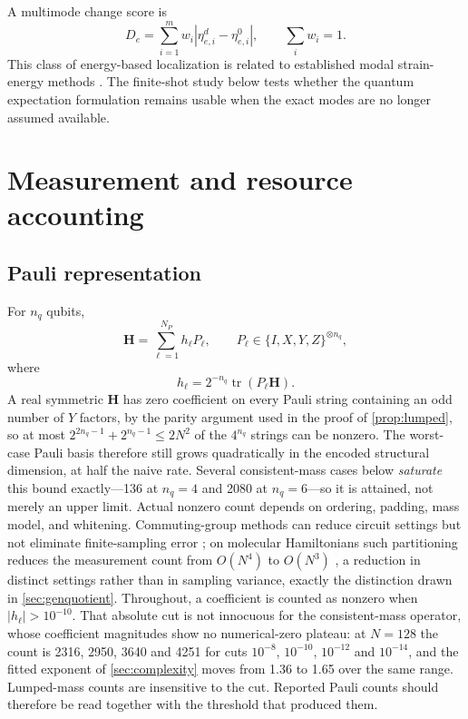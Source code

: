 \documentclass{ieeeaccess}
\newcommand{\Hq}{\mathbf{H}}
\newcommand{\tr}{\operatorname{tr}}
\begin{document}
A multimode change score is
\begin{equation}
D_e=\sum_{i=1}^{m}w_i|\eta_{e,i}^{d}-\eta_{e,i}^{0}|,
\qquad \sum_iw_i=1.
\label{eq:damageindex}
\end{equation}
This class of energy-based localization is related to established modal strain-energy methods \cite{Stubbs1995,Cornwell1999}. The finite-shot study below tests whether the quantum expectation formulation remains usable when the exact modes are no longer assumed available.

\section{Measurement and resource accounting}
\label{sec:resources}

\subsection{Pauli representation}

For $n_q$ qubits,
\begin{equation}
\Hq=\sum_{\ell=1}^{N_P}h_\ell P_\ell,
\qquad P_\ell\in\{I,X,Y,Z\}^{\otimes n_q},
\label{eq:pauli}
\end{equation}
where
\begin{equation}
h_\ell=2^{-n_q}\tr(P_\ell\Hq).
\end{equation}
A real symmetric $\Hq$ has zero coefficient on every Pauli string containing an odd number of $Y$ factors, by the parity argument used in the proof of \cref{prop:lumped}, so at most $2^{2n_q-1}+2^{n_q-1}\le2N^2$ of the $4^{n_q}$ strings can be nonzero. The worst-case Pauli basis therefore still grows quadratically in the encoded structural dimension, at half the naive rate. Several consistent-mass cases below \emph{saturate} this bound exactly---136 at $n_q=4$ and 2080 at $n_q=6$---so it is attained, not merely an upper limit. Actual nonzero count depends on ordering, padding, mass model, and whitening. Commuting-group methods can reduce circuit settings but not eliminate finite-sampling error \cite{Crawford2021,Gokhale2020}; on molecular Hamiltonians such partitioning reduces the measurement count from $O(N^4)$ to $O(N^3)$ \cite{Gokhale2020}, a reduction in distinct settings rather than in sampling variance, exactly the distinction drawn in \cref{sec:genquotient}. Throughout, a coefficient is counted as nonzero when $|h_\ell|>10^{-10}$. That absolute cut is not innocuous for the consistent-mass operator, whose coefficient magnitudes show no numerical-zero plateau: at $N=128$ the count is 2316, 2950, 3640 and 4251 for cuts $10^{-8}$, $10^{-10}$, $10^{-12}$ and $10^{-14}$, and the fitted exponent of \cref{sec:complexity} moves from 1.36 to 1.65 over the same range. Lumped-mass counts are insensitive to the cut. Reported Pauli counts should therefore be read together with the threshold that produced them.
\end{document}
